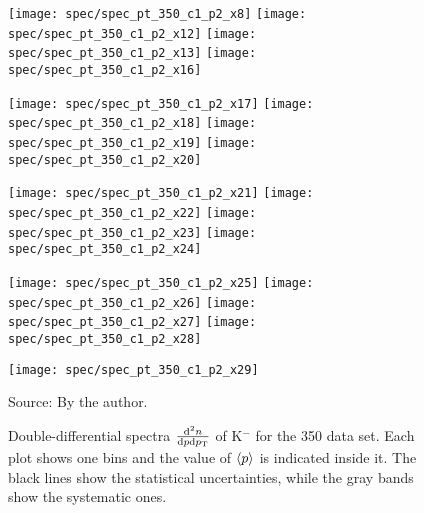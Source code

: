 \begin{figure}[!ht]
  \centering

  \texttt{[image: spec/spec\_pt\_350\_c1\_p2\_x8]}
  \texttt{[image: spec/spec\_pt\_350\_c1\_p2\_x12]}
  \texttt{[image: spec/spec\_pt\_350\_c1\_p2\_x13]}
  \texttt{[image: spec/spec\_pt\_350\_c1\_p2\_x16]}

  \texttt{[image: spec/spec\_pt\_350\_c1\_p2\_x17]}
  \texttt{[image: spec/spec\_pt\_350\_c1\_p2\_x18]}
  \texttt{[image: spec/spec\_pt\_350\_c1\_p2\_x19]}
  \texttt{[image: spec/spec\_pt\_350\_c1\_p2\_x20]}

  \texttt{[image: spec/spec\_pt\_350\_c1\_p2\_x21]}
  \texttt{[image: spec/spec\_pt\_350\_c1\_p2\_x22]}
  \texttt{[image: spec/spec\_pt\_350\_c1\_p2\_x23]}
  \texttt{[image: spec/spec\_pt\_350\_c1\_p2\_x24]}

  \texttt{[image: spec/spec\_pt\_350\_c1\_p2\_x25]}
  \texttt{[image: spec/spec\_pt\_350\_c1\_p2\_x26]}
  \texttt{[image: spec/spec\_pt\_350\_c1\_p2\_x27]}
  \texttt{[image: spec/spec\_pt\_350\_c1\_p2\_x28]}

  \texttt{[image: spec/spec\_pt\_350\_c1\_p2\_x29]}
 
 \caption{Double-differential spectra $\frac{\text{d}^2n}{\text{d}p\text{d}p_\text{T}}$
    of K$^-$ for the 350 \GeVc data set. Each plot shows one \pp bins and the value
    of $\langle p\rangle$ is indicated inside it. The black lines show the statistical
    uncertainties, while the gray bands show the systematic ones.}
  \label{fig:hadron:spec:dedx:all350:c1p2}
  \begin{center}
    \small Source: By the author. 
  \end{center}
\end{figure}

